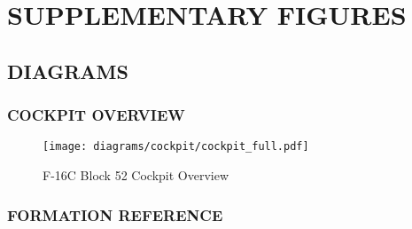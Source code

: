 \appendix
\chapter[SUPP. FIGURES]{SUPPLEMENTARY FIGURES}
\localtableofcontents
\thispagestyle{plain}
\cleardoublepage


\section{DIAGRAMS}

\subsection{COCKPIT OVERVIEW}
\begin{figure}[h]
    \centering
    \texttt{[image: diagrams/cockpit/cockpit\_full.pdf]}
    \caption{F-16C Block 52 Cockpit Overview}
    \label{fig:cockpitoverview}
\end{figure}

\clearpage

\subsection{FORMATION REFERENCE}

